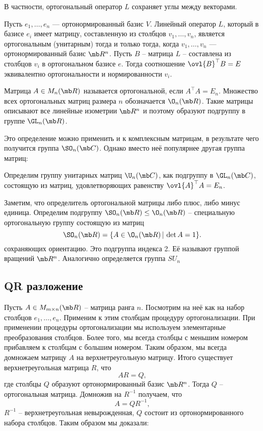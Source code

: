 \crl В частности, ортогональный оператор  $L$ сохраняет углы между векторами.
\ecrl

\crl Пусть $e_1,\dots,e_n$ --- ортонормированный базис $V$. Линейный оператор $L$, который в базисе $e_i$ имеет матрицу, составленную из столбцов $v_1,\dots,v_n$, является ортогональным (унитарным) тогда и только тогда, когда $v_1,\dots,v_n$ --- ортонормированный базис $\mb R^n$. 
\proof
Пусть $B$ -- матрица $L$ -- составлена из столбцов $v_i$ в ортогональном базисе $e$. Тогда соотношение $\ovl{B}^{\top}B=E$ эквивалентно ортогональности и нормированности $v_i$.
\endproof
\ecrl




\dfn Матрица $A\in M_n(\mb R)$ называется ортогональной, если $A^{\top}A=E_n$. Множество всех ортогональных матриц размера $n$ обозначается $\O_n(\mb R)$. Такие матрицы описывают все линейные изометрии $\mb R^n$  и поэтому образуют подгруппу в группе $\GL_n(\mb R)$.
\edfn

\rm Это определение можно применить и к комплексным матрицам, в результате чего получится группа $\SO_n(\mb C)$. Однако вместо неё популярнее другая группа матриц:
\erm

\dfn Определим группу унитарных матриц $\U_n(\mb C)$, как подгруппу в $\GL_n(\mb C)$, состоящую из матриц, удовлетворяющих равенству $\ovl{A}^{\top}A=E_n$.
\edfn

\rm Заметим, что определитель ортогональной матрицы либо плюс, либо минус единица. Определим подгруппу $\SO_n(\mb R) \leq \O_n(\mb R)$ -- специальную ортогональную группу состоящую из матриц $$\SO_n(\mb R)= \{ A \in \O_n(\mb R)\, | \, \det A=1 \}.$$
сохраняющих ориентацию. Это подгруппа индекса 2. Её называют группой вращений $\mb R^n$.
Аналогично определяется группа $SU_n$
\erm 


\subsection{QR разложение}

Пусть $A \in M_{m\times n}(\mb R)$ -- матрица ранга $n$. Посмотрим на неё как на набор столбцов $e_1,\dots,e_n$. Применим к этим столбцам процедуру ортогонализации. При применении процедуры ортогонализации мы используем элементарные преобразования столбцов. Более того, мы всегда столбцы с меньшим номером прибавляем к столбцам с большим номером. Таким образом, мы всегда домножаем матрицу $A$ на верхнетреугольную матрицу. Итого существует верхнетреугольная матрица $R$, что 
$$AR=Q,$$ 
где столбцы $Q$ образуют ортонормированный базис $\mb R^n$. Тогда  $Q$ -- ортогональная матрица. Домножив на $R^{-1}$ получаем, что 
$$A=QR^{-1},$$
$R^{-1}$ -- верхнетреугольная невырожденная, $Q$ состоит из ортонормированного набора столбцов. Таким образом мы доказали:

